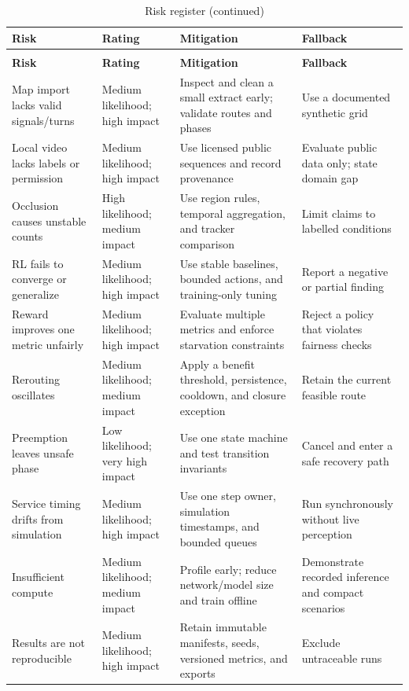 \begin{longtable}{P{0.20\textwidth}P{0.16\textwidth}P{0.34\textwidth}P{0.19\textwidth}}
\caption{Risk register}\label{tab:risks}\\
\toprule
\textbf{Risk} & \textbf{Rating} & \textbf{Mitigation} & \textbf{Fallback}\\
\midrule\endfirsthead
\caption[]{Risk register (continued)}\\
\toprule
\textbf{Risk} & \textbf{Rating} & \textbf{Mitigation} & \textbf{Fallback}\\
\midrule\endhead
Map import lacks valid signals/turns & Medium likelihood; high impact & Inspect and clean a small extract early; validate routes and phases & Use a documented synthetic grid\\
Local video lacks labels or permission & Medium likelihood; high impact & Use licensed public sequences and record provenance & Evaluate public data only; state domain gap\\
Occlusion causes unstable counts & High likelihood; medium impact & Use region rules, temporal aggregation, and tracker comparison & Limit claims to labelled conditions\\
RL fails to converge or generalize & Medium likelihood; high impact & Use stable baselines, bounded actions, and training-only tuning & Report a negative or partial finding\\
Reward improves one metric unfairly & Medium likelihood; high impact & Evaluate multiple metrics and enforce starvation constraints & Reject a policy that violates fairness checks\\
Rerouting oscillates & Medium likelihood; medium impact & Apply a benefit threshold, persistence, cooldown, and closure exception & Retain the current feasible route\\
Preemption leaves unsafe phase & Low likelihood; very high impact & Use one state machine and test transition invariants & Cancel and enter a safe recovery path\\
Service timing drifts from simulation & Medium likelihood; high impact & Use one step owner, simulation timestamps, and bounded queues & Run synchronously without live perception\\
Insufficient compute & Medium likelihood; medium impact & Profile early; reduce network/model size and train offline & Demonstrate recorded inference and compact scenarios\\
Results are not reproducible & Medium likelihood; high impact & Retain immutable manifests, seeds, versioned metrics, and exports & Exclude untraceable runs\\
\bottomrule
\end{longtable}

